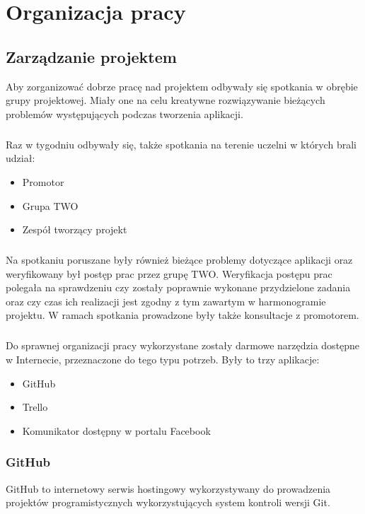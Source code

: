 \chapter{Organizacja pracy}

\section{Zarządzanie projektem}

Aby zorganizować dobrze pracę nad projektem odbywały się spotkania w obrębie grupy projektowej. Miały one na celu kreatywne rozwiązywanie bieżących problemów występujących podczas tworzenia aplikacji. 
\paragraph{}
Raz w tygodniu odbywały się, także spotkania na terenie uczelni w których brali udział:
\begin{itemize}
\item Promotor
\item Grupa TWO
\item Zespół tworzący projekt
\end{itemize}

\paragraph{}
Na spotkaniu poruszane były również bieżące problemy dotyczące aplikacji oraz weryfikowany był postęp prac przez grupę TWO. Weryfikacja postępu prac polegała na sprawdzeniu czy zostały poprawnie wykonane przydzielone zadania oraz czy czas ich realizacji jest zgodny z tym zawartym w harmonogramie projektu. W ramach spotkania prowadzone były także konsultacje z promotorem.
\paragraph{}
Do sprawnej organizacji pracy wykorzystane zostały darmowe narzędzia dostępne w Internecie, przeznaczone do tego typu potrzeb. Były to trzy aplikacje:
\begin{itemize}
\item GitHub
\item Trello
\item Komunikator dostępny w portalu Facebook
\end{itemize}

\subsection{GitHub}
GitHub to internetowy serwis hostingowy wykorzystywany do prowadzenia projektów programistycznych wykorzystujących system kontroli wersji Git. 
